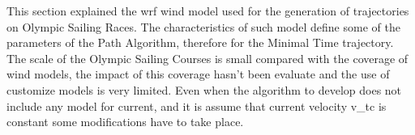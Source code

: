 




This section explained the \acrshort{wrf} wind model used for the generation of trajectories on Olympic Sailing Races. The characteristics of such model define some of the parameters of the Path Algorithm, therefore for the Minimal Time trajectory. The scale of the Olympic Sailing Courses is small compared with the coverage of wind models, the impact of this coverage hasn't been evaluate and the use of customize models is very limited. Even when the algorithm to develop does not include any model for current, and it is assume that current velocity \acrshort{v_tc} is constant some modifications have to take place. 